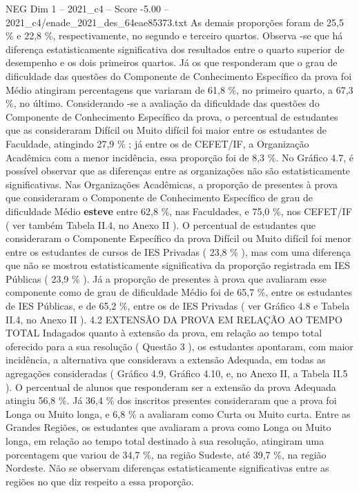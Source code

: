 \begin{textsample}{NEG Dim 1 – 2021\_c4 – Score -5.00 – 2021\_c4/enade\_2021\_des\_64eae85373.txt}
As demais proporções foram de 25,5 \% e 22,8 \%, respectivamente, no segundo e terceiro quartos.
Observa -se que há diferença estatisticamente significativa dos resultados entre o quarto superior de desempenho e os dois primeiros quartos.
Já os que responderam que o grau de dificuldade das questões do Componente de Conhecimento Específico da prova foi Médio atingiram percentagens que variaram de 61,8 \%, no primeiro quarto, a 67,3 \%, no último.
Considerando -se a avaliação da dificuldade das questões do Componente de Conhecimento Específico da prova, o percentual de estudantes que as consideraram Difícil ou Muito difícil foi maior entre os estudantes de Faculdade, atingindo 27,9 \% ; já entre os de CEFET/IF, a Organização Acadêmica com a menor incidência, essa proporção foi de 8,3 \%.
No Gráfico 4.7, é possível observar que as diferenças entre as organizações não são estatisticamente significativas.
Nas Organizações Acadêmicas, a proporção de presentes à prova que consideraram o Componente de Conhecimento Específico de grau de dificuldade Médio \textbf{esteve} entre 62,8 \%, nas Faculdades, e 75,0 \%, nos CEFET/IF ( ver também Tabela II.4, no Anexo II ).
O percentual de estudantes que consideraram o Componente Específico da prova Difícil ou Muito difícil foi menor entre os estudantes de cursos de IES Privadas ( 23,8 \% ), mas com uma diferença que não se mostrou estatisticamente significativa da proporção registrada em IES Públicas ( 23,9 \% ).
Já a proporção de presentes à prova que avaliaram esse componente como de grau de dificuldade Médio foi de 65,7 \%, entre os estudantes de IES Públicas, e de 65,2 \%, entre os de IES Privadas ( ver Gráfico 4.8 e Tabela II.4, no Anexo II ). 4.2 EXTENSÃO DA PROVA EM RELAÇÃO AO TEMPO TOTAL Indagados quanto à extensão da prova, em relação ao tempo total oferecido para a sua resolução ( Questão 3 ), os estudantes apontaram, com maior incidência, a alternativa que considerava a extensão Adequada, em todas as agregações consideradas ( Gráfico 4.9, Gráfico 4.10, e, no Anexo II, a Tabela II.5 ).
O percentual de alunos que responderam ser a extensão da prova Adequada atingiu 56,8 \%.
Já 36,4 \% dos inscritos presentes consideraram que a prova foi Longa ou Muito longa, e 6,8 \% a avaliaram como Curta ou Muito curta.
Entre as Grandes Regiões, os estudantes que avaliaram a prova como Longa ou Muito longa, em relação ao tempo total destinado à sua resolução, atingiram uma porcentagem que variou de 34,7 \%, na região Sudeste, até 39,7 \%, na região Nordeste.
Não se observam diferenças estatisticamente significativas entre as regiões no que diz respeito a essa proporção.

\end{textsample}

